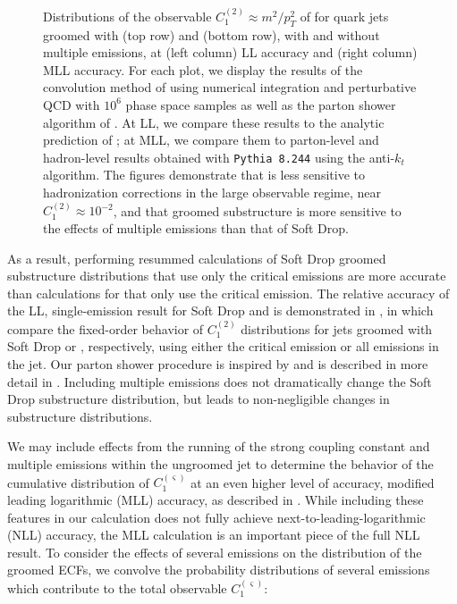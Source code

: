 \begin{figure}[t!]
{\label{fig:MLL_PRSF1}
}
\caption{
Distributions of the observable \(C_1^{(2)}\approx m^2 / p_T^2\) of  for quark jets groomed with  (top row) and  (bottom row), with and without multiple emissions, at (left column) LL accuracy and (right column) MLL accuracy.
%
For each plot, we display the results of the convolution method of  using numerical integration and perturbative QCD with \(10^6\) phase space samples as well as the parton shower algorithm of .
%
At LL, we compare these results to the analytic prediction of ;
%
at MLL, we compare them to parton-level and hadron-level results obtained with \texttt{Pythia 8.244} using the anti-\(k_t\) algorithm.
%
The figures demonstrate that  is less sensitive to hadronization corrections in the large observable regime, near \(C_1^{(2)} \approx 10^{-2}\), and that  groomed substructure is more sensitive to the effects of multiple emissions than that of Soft Drop.
}
\label{fig:Calculations}
\end{figure}

As a result, performing resummed calculations of Soft Drop groomed substructure distributions that use only the critical emissions are more accurate than calculations for  that only use the critical emission.
%
The relative accuracy of the LL, single-emission result for Soft Drop and  is demonstrated in , in which compare the fixed-order behavior of \(C_1^{(2)}\) distributions for jets groomed with Soft Drop or , respectively, using either the critical emission or all emissions in the jet.
%
Our parton shower procedure is inspired by  and is described in more detail in .
%
Including multiple emissions does not dramatically change the Soft Drop substructure distribution, but leads to non-negligible changes in  substructure distributions.


We may include effects from the running of the strong coupling constant and multiple emissions within the ungroomed jet to determine the behavior of the cumulative distribution of \(C_1^{(\varsigma)}\) at an even higher level of accuracy, modified leading logarithmic (MLL) accuracy, as described in .
%
While including these features in our calculation does not fully achieve next-to-leading-logarithmic (NLL) accuracy, the MLL calculation is an important piece of the full NLL result.
%
To consider the effects of several emissions on the distribution of the groomed ECFs, we convolve the probability distributions of several emissions which contribute to the total observable \(C_1^{(\varsigma)}\):

